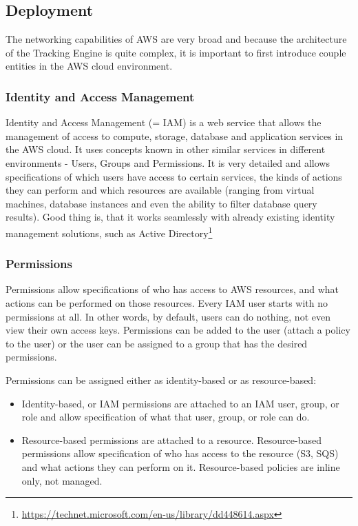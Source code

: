 \subsection{Deployment}

The networking capabilities of AWS are very broad and because the architecture of the Tracking Engine is quite complex, it is important to first introduce couple entities in the AWS cloud environment.

\subsubsection*{Identity and Access Management}

Identity and Access Management (= IAM) is a web service that allows the management of access to compute, storage, database and application services in the AWS cloud. It uses concepts known in other similar services in different environments - Users, Groups and Permissions. It is very detailed and allows specifications of which users have access to certain services, the kinds of actions they can perform and which resources are available (ranging from virtual machines, database instances and even the ability to filter database query results). Good thing is, that it works seamlessly with already existing identity management solutions, such as Active Directory\footnote{\url{https://technet.microsoft.com/en-us/library/dd448614.aspx}}

\subsubsection*{Permissions}

Permissions allow specifications of who has access to AWS resources, and what actions can be performed on those resources. Every IAM user starts with no permissions at all. In other words, by default, users can do nothing, not even view their own access keys. Permissions can be added to the user (attach a policy to the user) or the user can be assigned to a group that has the desired permissions.

Permissions can be assigned either as identity-based or as resource-based:

\begin{itemize}
	\item Identity-based, or IAM permissions are attached to an IAM user, group, or role and allow specification of what that user, group, or role can do.
	\item Resource-based permissions are attached to a resource. Resource-based permissions allow specification of who has access to the resource (S3, SQS) and what actions they can perform on it. Resource-based policies are inline only, not managed.
\end{itemize}

